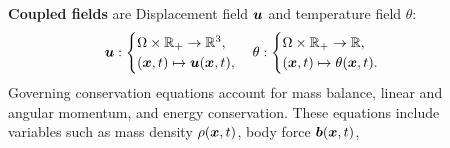 \documentclass[25pt, a0paper,
portrait,
margin=2mm, 
innermargin=2mm, 
blockverticalspace=7mm, %
colspace=2mm, %
subcolspace=0mm]{tikzposter}
\makeatletter
\newcommand*{\inputfig}[3][htb]{{
    \def\fps@figure{#1}
    \def\DIR{#2}
    \def\LABEL{#3}
    \graphicspath{{\DIR/}}
    
}}
\makeatother
\begin{document}
\begin{columns}
	{
		\begin{minipage}{0.35\textwidth}
			\begin{mdframed}
				\begin{center}
					\inputfig{floats/structuralfivefields_multi_edited}{structuralfivefields_multi_edited}
				\end{center}
				\vspace{-14mm}
			\end{mdframed}
			\begin{mdframed}
				\textbf{Coupled fields} are  
				Displacement field ${\boldsymbol{\mathnormal u}}$ and temperature field $\theta$:
				\begin{align*}
					{\boldsymbol{\mathnormal u}}:
					\begin{cases}
						\Omega \times \mathbb{R}_{+} \rightarrow \mathbb{R}^3, \\
						({\boldsymbol{\mathnormal x}},t) \mapsto {\boldsymbol{\mathnormal u}}({\boldsymbol{\mathnormal x}},t),
					\end{cases}
					\theta:
					\begin{cases}
						\Omega \times \mathbb{R}_{+} \rightarrow \mathbb{R}, \\
						({\boldsymbol{\mathnormal x}},t) \mapsto \theta({\boldsymbol{\mathnormal x}},t).
					\end{cases}
				\end{align*}
				Governing conservation equations
				account for mass balance, 
				linear and angular momentum,
				and energy conservation.
				These equations include variables such as
				mass density $\rho({\boldsymbol{\mathnormal x}},t)$, 
				body force ${\boldsymbol{\mathnormal b}}({\boldsymbol{\mathnormal x}},t)$,

\end{mdframed}
\end{minipage}}
\end{columns}
\end{document}
